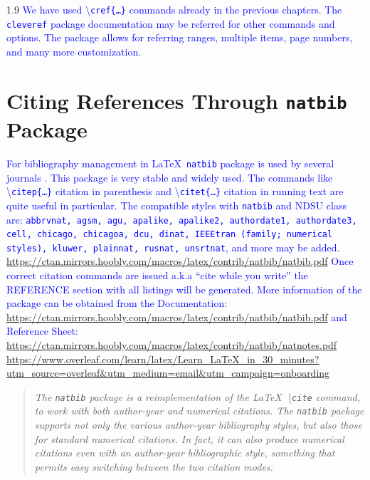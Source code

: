 \documentclass[phd]{ndsu-thesis-2022}
\newcommand\myspacing{1.9} %
\newcommand\italk[1]{\textcolor{blue}{#1}}  %
\newcommand\cmd[1]{\textbackslash\texttt{#1}}  %
\newcommand\vb[1]{\textcolor{blue}{\texttt{#1}}}%
\begin{document}
\begin{spacing}{\myspacing}
\italk{We have used \cmd{cref\{\ldots\}} commands already in the previous chapters. The \vb{cleveref} package documentation may be referred for other commands and options. The package allows for referring ranges, multiple items, page numbers, and many more customization.  
}



\section{Citing References Through \texttt{natbib} Package}
\italk{For bibliography management in \LaTeX\ \texttt{natbib} package is used by several journals \citep{daly2010natural}. This package is very stable and widely used. The commands like \cmd{citep\{\ldots\}} citation in parenthesis and \cmd{citet\{\ldots\}} citation in running text are quite useful in particular. The compatible styles with \texttt{natbib} and NDSU class are:  \texttt{abbrvnat, agsm, agu, apalike, apalike2, authordate1, authordate3, cell, chicago, chicagoa, dcu, dinat, IEEEtran (family;  numerical styles), kluwer, plainnat, rusnat, unsrtnat}, and more may be added. \url{https://ctan.mirrors.hoobly.com/macros/latex/contrib/natbib/natbib.pdf} Once correct citation commands are issued a.k.a ``cite while you write'' the REFERENCE section with all listings will be generated. More information of the package can be obtained from the Documentation: \textcolor{magenta}{\url{https://ctan.mirrors.hoobly.com/macros/latex/contrib/natbib/natbib.pdf}} and Reference Sheet: \!\!\textcolor{magenta}{\url{https://ctan.mirrors.hoobly.com/macros/latex/contrib/natbib/natnotes.pdf}}
\textcolor{magenta}{\url{https://www.overleaf.com/learn/latex/Learn_LaTeX_in_30_minutes?utm_source=overleaf&utm_medium=email&utm_campaign=onboarding}}}



\begin{quote}
\singlespacing
\raggedleft
\textit{The \texttt{natbib} package is a reimplementation of the \LaTeX\ \cmd{cite} command, to work with both author-year and numerical citations. The \texttt{natbib} package supports not only the various author-year bibliography styles, but also those for standard numerical citations. In fact, it can also produce numerical citations even with an author-year bibliographic style, something that permits easy switching between the two citation modes.} 


\end{quote}
\end{spacing}
\end{document}
